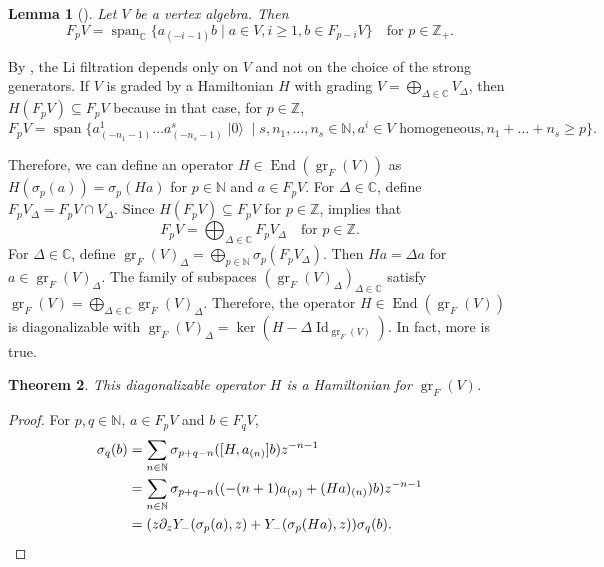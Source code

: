 \documentclass[a4paper, 12pt, reqno]{amsart}
\newtheorem{theorem}{Theorem}[section]
\newtheorem{lemma}[theorem]{Lemma}
\theoremstyle{remark}
\numberwithin{equation}{subsection}
\DeclareMathOperator{\Id}{Id}
\DeclareMathOperator{\gr}{gr}
\DeclareMathOperator{\End}{End}
\DeclareMathOperator{\vspan}{span}
\DeclareMathOperator{\vac}{|0\rangle}
\begin{document}
\begin{lemma}[{\cite[Lemma 2.9]{li_abelianizing_2005}}]
  \label{lmm:19}
  Let $V$ be a vertex algebra.
  Then
  \begin{equation*}
    F_pV = \vspan_{\mathbb{C}}\{a_{(-i - 1)}b \mid a \in V, i \ge 1, b \in F_{p - i}V\} \quad \text{for }p \in \mathbb{Z}_+.
  \end{equation*}
\end{lemma}

By , the Li filtration depends only on $V$ and not on the choice of the strong generators.
If $V$ is graded by a Hamiltonian $H$ with grading $V = \bigoplus_{\Delta \in \mathbb{C}}V_{\Delta}$, then $H(F_pV) \subseteq F_pV$ because in that case, for $p \in \mathbb{Z}$,
\begin{equation*}
F_pV =\vspan \{a^1_{(-n_1 - 1)}\dots a^s_{(-n_s - 1)}\vac \mid s, n_1, \dots, n_s \in \mathbb{N}, a^i \in V\text{ homogeneous}, n_1 + \dots + n_s \ge p\}.
\end{equation*}

Therefore, we can define an operator $H \in \End(\gr_F(V))$ as $H(\sigma_p(a)) = \sigma_p(Ha)$ for $p \in \mathbb{N}$ and $a \in F_pV$.
For $\Delta \in \mathbb{C}$, define $F_pV_{\Delta} = F_pV \cap V_{\Delta}$.
Since $H(F_pV) \subseteq F_pV$ for $p \in \mathbb{Z}$,  implies that
\begin{equation}
  \label{eq:44}
  F_pV = \bigoplus_{\Delta \in \mathbb{C}}F_pV_{\Delta} \quad \text{for }p \in \mathbb{Z}.
\end{equation}
For $\Delta \in \mathbb{C}$, define $\gr_F(V)_{\Delta} = \bigoplus_{p \in \mathbb{N}}\sigma_p(F_pV_{\Delta})$.
Then $Ha = \Delta a$ for $a \in \gr_F(V)_{\Delta}$.
The family of subspaces $(\gr_F(V)_{\Delta})_{\Delta \in \mathbb{C}}$ satisfy $\gr_F(V) = \bigoplus_{\Delta \in \mathbb{C}} \gr_F(V)_{\Delta}$.
Therefore, the operator $H \in \End(\gr_F(V))$ is diagonalizable with $\gr_F(V)_{\Delta} = \ker(H - \Delta\Id_{\gr_F(V)})$.
In fact, more is true.
\begin{theorem}
  \label{thr:45}
  This diagonalizable operator $H$ is a Hamiltonian for $\gr_F(V)$.
\end{theorem}

\begin{proof}
  For $p, q \in \mathbb{N}$, $a \in F_pV$ and $b \in F_qV$,
  \begin{align*}
    [H, Y_-(\sigma_p(a), z)]\sigma_q(b) &= \sum_{n \in \mathbb{N}}\sigma_{p + q -n}([H, a_{(n)}]b)z^{-n -1} \\
    &= \sum_{n \in \mathbb{N}}\sigma_{p + q -n}((-(n + 1)a_{(n)} + (Ha)_{(n)})b)z^{-n - 1} \\
    &= (z\partial_zY_-(\sigma_p(a), z) + Y_-(\sigma_p(Ha), z))\sigma_q(b). \qedhere
  \end{align*}
\end{proof}
\end{document}
